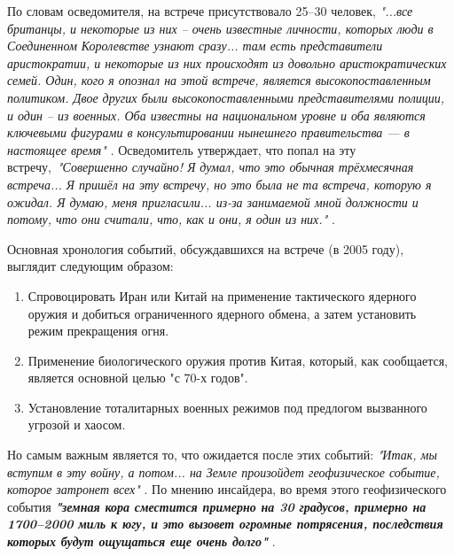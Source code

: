 \documentclass[10pt,twocolumn,letterpaper]{article}
\begin{document}
По словам осведомителя, на встрече присутствовало 25–30 человек, \textit{"...все британцы, и некоторые из них – очень известные личности, которых люди в Соединенном Королевстве узнают сразу... там есть представители аристократии, и некоторые из них происходят из довольно аристократических семей. Один, кого я опознал на этой встрече, является высокопоставленным политиком. Двое других были высокопоставленными представителями полиции, и один – из военных. Оба известны на национальном уровне и оба являются ключевыми фигурами в консультировании нынешнего правительства — в настоящее время"} \cite{4}. Осведомитель утверждает, что попал на эту встречу,\ \textit{"Совершенно случайно! Я думал, что это обычная трёхмесячная встреча... Я пришёл на эту встречу, но это была не та встреча, которую я ожидал. Я думаю, меня пригласили... из-за занимаемой мной должности и потому, что они считали, что, как и они, я один из них."} \cite{4}.

Основная хронология событий, обсуждавшихся на встрече (в 2005 году), выглядит следующим образом:

\begin{flushleft}
\begin{enumerate}
    \item Спровоцировать Иран или Китай на применение тактического ядерного оружия и добиться ограниченного ядерного обмена, а затем установить режим прекращения огня.
    \item Применение биологического оружия против Китая, который, как сообщается, является основной целью "с 70-х годов".
    \item Установление тоталитарных военных режимов под предлогом вызванного угрозой и хаосом.
\end{enumerate}
\end{flushleft}

Но самым важным является то, что ожидается после этих событий: \textit{"Итак, мы вступим в эту войну, а потом... на Земле произойдет геофизическое событие, которое затронет всех"} \cite{4}. По мнению инсайдера, во время этого геофизического события \textit{\textbf{"земная кора сместится примерно на 30 градусов, примерно на 1700–2000 миль к югу, и это вызовет огромные потрясения, последствия которых будут ощущаться еще очень долго"}} \cite{4}.
\end{document}
